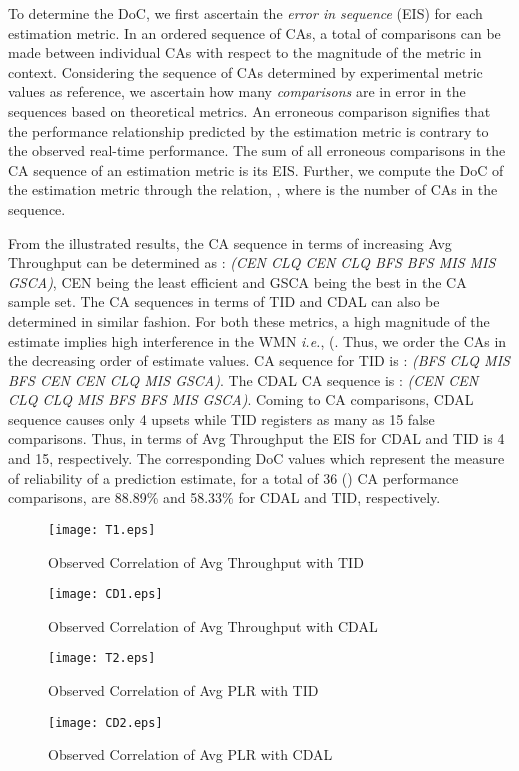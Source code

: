 \documentclass[conference]{IEEEtran}
\begin{document}
To determine the DoC, we first ascertain the \textit{error in sequence} (EIS) for each estimation metric. In an ordered sequence of  CAs, a total of   comparisons can be made between individual CAs with respect to the magnitude of the metric in context. Considering the sequence of CAs determined by experimental metric values as reference, we ascertain how many \textit{comparisons} are in error in the sequences based on theoretical metrics. An erroneous comparison signifies that the performance relationship predicted by the estimation metric is contrary to the observed real-time performance. The sum of all erroneous comparisons in the CA sequence of an estimation metric is its EIS. Further, we compute the DoC of the estimation metric through the relation, \mbox{}, where  is the number of CAs in the sequence.

From the illustrated results, the CA sequence in terms of increasing Avg Throughput can be determined as : \textit{(CEN  CLQ  CEN  CLQ  BFS  BFS  MIS  MIS  GSCA)}, CEN being the least efficient and GSCA being the best in the CA sample set. The CA sequences in terms of TID and CDAL can also be determined in similar fashion. For both these metrics, a high magnitude of the estimate implies high interference in the WMN \emph{i.e.}, (. Thus, we order the CAs in the decreasing order of estimate values. CA sequence for TID is : \textit{(BFS  CLQ  MIS  BFS  CEN  CEN  CLQ  MIS  GSCA)}. The CDAL CA sequence is :  \textit{(CEN  CEN  CLQ  CLQ  MIS  BFS  BFS  MIS  GSCA)}. Coming to CA comparisons, CDAL sequence causes only 4 upsets while TID registers as many as 15 false 
comparisons. Thus, in terms of Avg Throughput the EIS for CDAL and TID is 4 and 15, respectively. The corresponding DoC values which represent the measure of reliability of a prediction estimate, for a total of 36 () CA performance comparisons, are 88.89\% and 58.33\% for CDAL and TID, respectively. 
 \begin{figure}[htb!]
                \centering
                \texttt{[image: T1.eps]}
                \caption{Observed Correlation of Avg Throughput with TID} 
                \label{TIDX1}
        \end{figure} 
    \begin{figure}[htb!]
	    \centering
	    \texttt{[image: CD1.eps]}
	    \caption{Observed Correlation of Avg Throughput with CDAL} 
	    \label{TIDX2}
    \end{figure} 

\begin{figure}[htb!]
                \centering
                \texttt{[image: T2.eps]}
                \caption{Observed Correlation of Avg PLR with TID} 
                \label{TIDX3}
        \end{figure} 
    \begin{figure}[htb!]
	    \centering
	    \texttt{[image: CD2.eps]}
	    \caption{Observed Correlation of Avg PLR with CDAL} 
	    \label{TIDX4}
    \end{figure}
    
\end{document}
